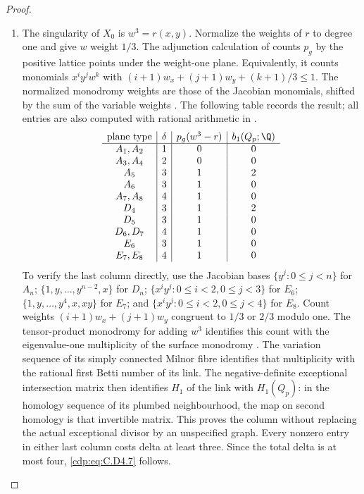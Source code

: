 \begin{proof}
\begin{enumerate}[label={$\langle1\rangle$\arabic*.},leftmargin=*]
\item The singularity of $X_0$ is $w^3=r(x,y)$. Normalize the
weights of $r$ to degree one and give $w$ weight $1/3$.
The adjunction calculation of
\cite[Theorem 2.1.1 and Corollary 2.1.3]{MerleTeissier1977}
counts $p_g$ by the positive lattice points under the
weight-one plane. Equivalently, it counts monomials
$x^iy^jw^k$ with
$(i+1)w_x+(j+1)w_y+(k+1)/3\le1$.
The normalized monodromy weights are those of the Jacobian
monomials, shifted by the sum of the variable weights
\cite[pp. 165--167]{Steenbrink1989Spectrum}.
The following table records the result; all entries are
also computed with rational arithmetic in
.
\[
\begin{array}{c|c|c|c}
 \hbox{plane type}&\delta&p_g(w^3-r)&b_1(Q_p;\Q)\\ \hline
 A_1,A_2&1&0&0\\
 A_3,A_4&2&0&0\\
 A_5&3&1&2\\
 A_6&3&1&0\\
 A_7,A_8&4&1&0\\
 D_4&3&1&2\\
 D_5&3&1&0\\
 D_6,D_7&4&1&0\\
 E_6&3&1&0\\
 E_7,E_8&4&1&0
\end{array}
\]
To verify the last column directly, use the Jacobian bases
$\{y^j:0\le j<n\}$ for $A_n$;
$\{1,y,\ldots,y^{n-2},x\}$ for $D_n$;
$\{x^iy^j:0\le i<2,0\le j<3\}$ for $E_6$;
$\{1,y,\ldots,y^4,x,xy\}$ for $E_7$; and
$\{x^iy^j:0\le i<2,0\le j<4\}$ for $E_8$.
Count weights $(i+1)w_x+(j+1)w_y$ congruent to $1/3$ or
$2/3$ modulo one. The tensor-product monodromy for adding
$w^3$ identifies this count with the eigenvalue-one
multiplicity of the surface monodromy
\cite[\S1 and Example 2.4(a)]{Nemethi1991Join}.
The variation sequence of its simply connected Milnor fibre
identifies that multiplicity with the rational first Betti
number of its link. The negative-definite exceptional
intersection matrix then identifies $H_1$ of the link with
$H_1(Q_p)$: in the homology sequence of its plumbed
neighbourhood, the map on second homology is that invertible
matrix. This proves the column without replacing the actual
exceptional divisor by an unspecified graph.
Every nonzero entry in either last column costs delta at
least three. Since the total delta is at most four,
\eqref{cdp:eq:C.D4.7} follows.


\end{enumerate}
\end{proof}
